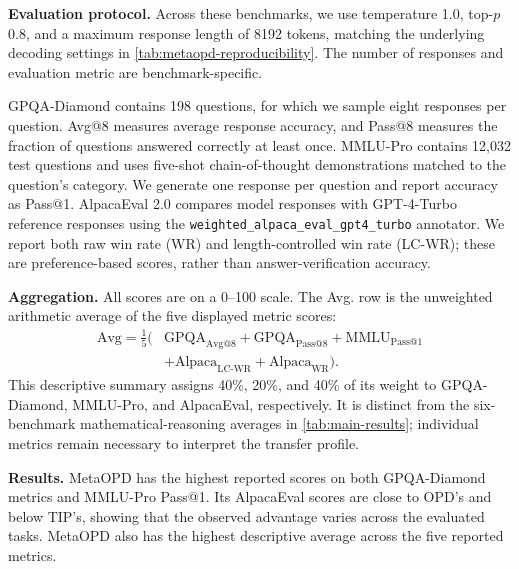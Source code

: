 \documentclass{article}
\theoremstyle{plain}
\theoremstyle{definition}
\theoremstyle{remark}
\begin{document}
\textbf{Evaluation protocol.}
Across these benchmarks, we use temperature 1.0, top-\(p\) 0.8, and a maximum response length of 8192 tokens, matching the underlying decoding settings in \cref{tab:metaopd-reproducibility}. The number of responses and evaluation metric are benchmark-specific.

GPQA-Diamond contains 198 questions, for which we sample eight responses per question. Avg@8 measures average response accuracy, and Pass@8 measures the fraction of questions answered correctly at least once. MMLU-Pro contains 12,032 test questions and uses five-shot chain-of-thought demonstrations matched to the question's category. We generate one response per question and report accuracy as Pass@1. AlpacaEval 2.0 compares model responses with GPT-4-Turbo reference responses using the \texttt{weighted\_alpaca\_eval\_gpt4\_turbo} annotator. We report both raw win rate (WR) and length-controlled win rate (LC-WR); these are preference-based scores, rather than answer-verification accuracy.

\textbf{Aggregation.}
All scores are on a 0--100 scale. The Avg. row is the unweighted arithmetic average of the five displayed metric scores:
\[
\begin{aligned}
\mathrm{Avg}=\tfrac{1}{5}\bigl(&\mathrm{GPQA}_{\mathrm{Avg@8}}+\mathrm{GPQA}_{\mathrm{Pass@8}}
+\mathrm{MMLU}_{\mathrm{Pass@1}}\\
&+\mathrm{Alpaca}_{\mathrm{LC\text{-}WR}}+\mathrm{Alpaca}_{\mathrm{WR}}\bigr).
\end{aligned}
\]
This descriptive summary assigns 40\%, 20\%, and 40\% of its weight to GPQA-Diamond, MMLU-Pro, and AlpacaEval, respectively. It is distinct from the six-benchmark mathematical-reasoning averages in \cref{tab:main-results}; individual metrics remain necessary to interpret the transfer profile.

\textbf{Results.}
MetaOPD has the highest reported scores on both GPQA-Diamond metrics and MMLU-Pro Pass@1. Its AlpacaEval scores are close to OPD's and below TIP's, showing that the observed advantage varies across the evaluated tasks. MetaOPD also has the highest descriptive average across the five reported metrics.
\end{document}
